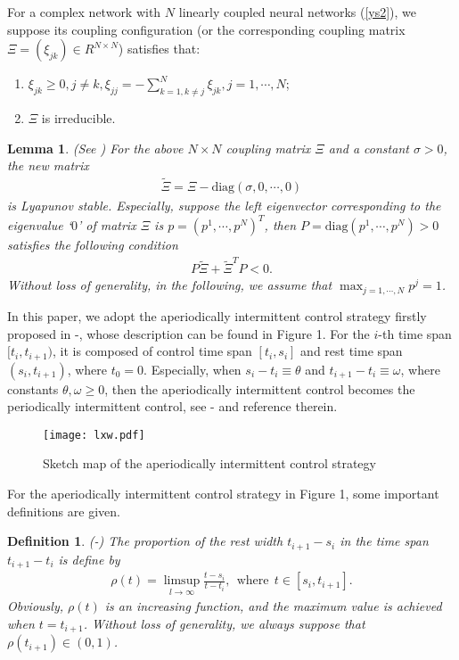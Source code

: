 \documentclass[review]{elsarticle}
\newtheorem{lem}{Lemma}
\newtheorem{mydef}{Definition}
\begin{document}
For a complex network with $N$ linearly coupled neural networks (\ref{ys2}), we suppose its coupling configuration (or the corresponding coupling matrix $\Xi=(\xi_{jk})\in R^{N\times N}$) satisfies that:
\begin{enumerate}
  \item $\xi_{jk}\geq 0, j\neq k, \xi_{jj}=-\sum_{k=1, k\neq j}^N \xi_{jk}, j=1,\cdots,N$;
  \item $\Xi$ is irreducible.
\end{enumerate}

\begin{lem}\label{lyasta}
(See \cite{CLL07}) For the above $N\times N$ coupling matrix $\Xi$ and a constant $\sigma>0$, the new matrix
\begin{align}\label{newmatrix}
\tilde{\Xi}=\Xi-\mathrm{diag}(\sigma,0,\cdots,0)
\end{align}
is Lyapunov stable. Especially, suppose the left eigenvector corresponding to the eigenvalue `$0$' of matrix $\Xi$ is $p=(p^1,\cdots,p^N)^T$, then $P=\mathrm{diag}(p^1,\cdots,p^N)>0$ satisfies the following condition
\begin{align*}
P\tilde{\Xi}+\tilde{\Xi}^TP<0.
\end{align*}
Without loss of generality, in the following, we assume that $\max_{j=1,\cdots,N}p^j=1$.
\end{lem}

In this paper, we adopt the aperiodically intermittent control strategy firstly proposed in \cite{LC2015}-\cite{LLC15}, whose description can be found in Figure 1. For the $i$-th time span $[t_i, t_{i+1})$, it is composed of control time span $[t_i, s_i]$ and rest time span $(s_i, t_{i+1})$, where $t_0=0$. Especially, when $s_i-t_i\equiv\theta$ and $t_{i+1}-t_i\equiv\omega$, where constants $\theta, \omega\ge 0$, then the aperiodically intermittent control becomes the periodically intermittent control, see \cite{HYJT2012}-\cite{LiuC11} and reference therein.

\begin{figure}
\begin{center}
\texttt{[image: lxw.pdf]}
\end{center}
\label{sk}
\caption{Sketch map of the aperiodically intermittent control strategy}
\end{figure}

For the aperiodically intermittent control strategy in Figure 1, some important definitions are given.
\begin{mydef}\label{rho}
(\cite{LC2015}-\cite{LLC15}) The proportion of the rest width $t_{i+1}-s_i$ in the time span $t_{i+1}-t_i$ is define by
\begin{align}\label{index}
\rho(t)=\limsup\limits_{l\to \infty}\frac{t-s_i}{t-t_i}, ~~\mathrm{where}~~ t\in [s_i, t_{i+1}].
\end{align}
Obviously, $\rho(t)$ is an increasing function, and the maximum value is achieved when $t=t_{i+1}$. Without loss of generality, we always suppose that $\rho(t_{i+1})\in (0,1)$.
\end{mydef}
\end{document}
